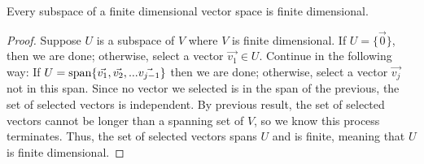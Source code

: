\begin{theorem}
	Every subspace of a finite dimensional vector space is finite dimensional.
\end{theorem}
\begin{proof}
	Suppose $U$ is a subspace of $V$ where $V$ is finite dimensional.
	If $U = \{\vec{0}\}$, then we are done; otherwise, select a vector $\vec{v_1} \in U$.
	Continue in the following way: If $U = \operatorname{span}\{\vec{v_1}, \vec{v_2}, ... \vec{v_{j-1}}\}$ then we are done; otherwise, select a vector $\vec{v_j}$ not in this span.
	Since no vector we selected is in the span of the previous, the set of selected vectors is independent.
	By previous result, the set of selected vectors cannot be longer than a spanning set of $V$, so we know this process terminates.
	Thus, the set of selected vectors spans $U$ and is finite, meaning that $U$ is finite dimensional.
\end{proof}